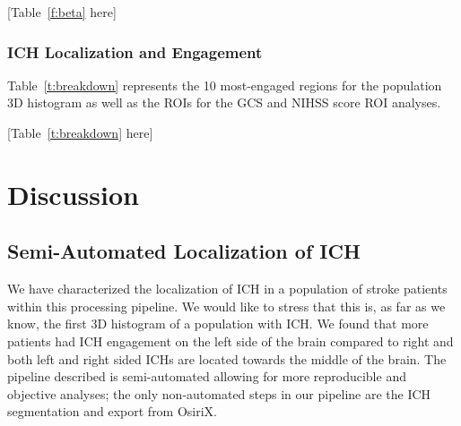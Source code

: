 \documentclass[10pt]{article}\usepackage[]{graphicx}\usepackage[]{color}
\begin{document}
[Table~\ref{f:beta} here]








\subsubsection*{ICH Localization and Engagement}

Table~\ref{t:breakdown} represents the 10 most-engaged regions for the population 3D histogram as well as the ROIs for the GCS and NIHSS score ROI analyses.  

[Table~\ref{t:breakdown} here]


\section*{Discussion}


\subsection*{Semi-Automated Localization of ICH}

We have characterized the localization of ICH in a population of stroke patients within this processing pipeline.  We would like to stress that this is, as far as we know, the first 3D histogram of a population with ICH.  We found that more patients had ICH engagement on the left side of the brain compared to right and both left and right sided ICHs are located towards the middle of the brain.  
The pipeline described is semi-automated allowing for more reproducible and objective analyses; the only non-automated steps in our pipeline are the ICH segmentation and export from OsiriX.  
\end{document}
